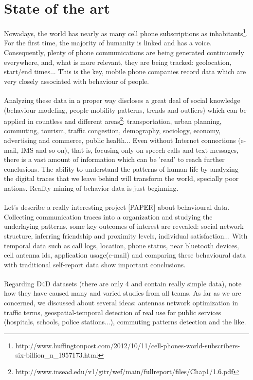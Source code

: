 \newpage

\section{State of the art}

Nowadays, the world has nearly as many cell phone subscriptions as inhabitants\footnote{http://www.huffingtonpost.com/2012/10/11/cell-phones-world-subscribers-six-billion\_n\_1957173.html}. For the first time, the majority of humanity is linked and has a voice. Consequently, plenty of phone communications are being generated continuously everywhere, and, what is more relevant, they are being tracked: geolocation, start/end times... This is the key, mobile phone companies record data which are very closely associated with behaviour of people.
\\
\\
Analyzing these data in a proper way discloses a great deal of social knowledge (behaviour modeling, people mobility patterns, trends and outliers) which can be applied in countless and different areas\footnote{http://www.insead.edu/v1/gitr/wef/main/fullreport/files/Chap1/1.6.pdf}: transportation, urban planning, commuting, tourism, traffic congestion, demography, sociology, economy, advertising and commerce, public health... Even without Internet connections (e-mail, IMS and so on), that is, focusing only on speech-calls and text messages, there is a vast amount of information which can be 'read' to reach further conclusions. The ability to understand the patterns of human life by analyzing the digital traces that we leave behind will transform the world, specially poor nations. Reality mining of behavior data is just beginning.
\\
\\
Let's describe a really interesting project [PAPER] about behavioural data. Collecting communication traces into a organization and studying the underlaying patterns, some key outcomes of interest are revealed: social network structure, inferring friendship and proximity levels, individual satisfaction... With temporal data such as call logs, location, phone status, near bluetooth devices, cell antenna ids, application usage(e-mail) and comparing these behavioural data with traditional self-report data show important conclusions.
\\
\\
Regarding D4D datasets (there are only 4 and contain really simple data), note how they have caused many and varied studies from all teams. As far as we are concerned, we discussed about several ideas: antennas network optimization in traffic terms, geospatial-temporal detection of real use for public services (hospitals, schools, police stations...), commuting patterns detection and the like.
